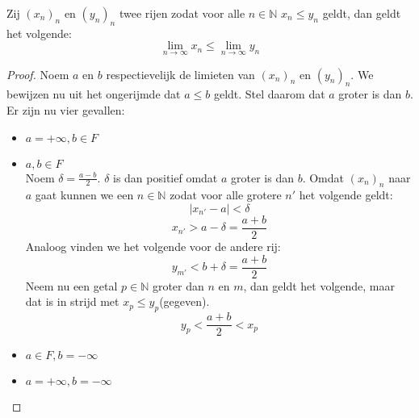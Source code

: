 \documentclass[main.tex]{subfiles}
\begin{document}
\begin{pr}
  \label{pr:limiet-behoudt-orde}
  Zij $(x_{n})_{n}$ en $(y_{n})_{n}$ twee rijen zodat voor alle $n\in \mathbb{N}$ $x_{n}\le y_{n}$ geldt, dan geldt het volgende:
  \[ \lim_{n\rightarrow \infty}x_{n} \le \lim_{n\rightarrow \infty}y_{n} \]

  \begin{proof}
    Noem $a$ en $b$ respectievelijk de limieten van $(x_{n})_{n}$ en $(y_{n})_{n}$.
    We bewijzen nu uit het ongerijmde dat $a \le b$ geldt.
    Stel daarom dat $a$ groter is dan $b$.
    Er zijn nu vier gevallen:
    \begin{itemize}
    \item $a = +\infty, b \in F$\\
    \item $a,b\in F$\\
      Noem $\delta = \frac{a-b}{2}$.
      $\delta$ is dan positief omdat $a$ groter is dan $b$.
      Omdat $(x_{n})_{n}$ naar $a$ gaat kunnen we een $n\in \mathbb{N}$ zodat voor alle grotere $n'$ het volgende geldt:
      \[ |x_{n'}-a|<\delta \]
      \[ x_{n'} > a - \delta = \frac{a+b}{2} \]
      Analoog vinden we het volgende voor de andere rij:
      \[ y_{m'} < b+\delta = \frac{a+b}{2} \]
      Neem nu een getal $p\in \mathbb{N}$ groter dan $n$ en $m$, dan geldt het volgende, maar dat is in strijd met $x_{p} \le y_{p}$(gegeven).
      \[ y_{p} < \frac{a+b}{2} < x_{p} \]
    \item $a\in F, b = -\infty$\\
    \item $a= +\infty, b=-\infty$\\
    \end{itemize}
  \end{proof}
\end{pr}
\end{document}
